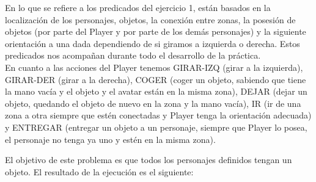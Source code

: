 En lo que se refiere a los predicados del ejercicio 1, están basados en la localización de los personajes, objetos, la conexión entre zonas, la posesión de objetos (por parte del Player y por parte de los demás personajes) y la siguiente orientación a una dada dependiendo de si giramos a izquierda o derecha. Estos predicados nos acompañan durante todo el desarrollo de la práctica. \\

En cuanto a las acciones del Player tenemos GIRAR-IZQ (girar a la izquierda), GIRAR-DER (girar a la derecha), COGER (coger un objeto, sabiendo que tiene la mano vacía y el objeto y el avatar están en la misma zona), DEJAR (dejar un objeto, quedando el objeto de nuevo en la zona y la mano vacía), IR (ir de una zona a otra siempre que estén conectadas y Player tenga la orientación adecuada) y ENTREGAR (entregar un objeto a un personaje, siempre que Player lo posea, el personaje no tenga ya uno y estén en la misma zona).

El objetivo de este problema es que todos los personajes definidos tengan un objeto. El resultado de la ejecución es el siguiente:

